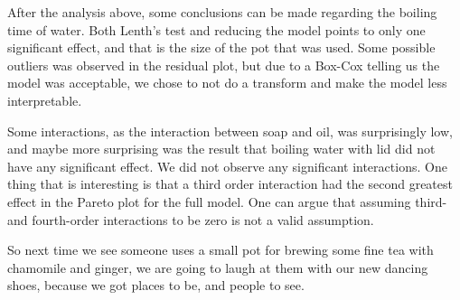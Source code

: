 After the analysis above, some conclusions can be made regarding the boiling time of water. Both Lenth's test and reducing the model points to only one significant effect, and that is the size of the pot that was used. Some possible outliers was observed in the residual plot, but due to a Box-Cox telling us the model was acceptable, we chose to not do a transform and make the model less interpretable.

Some interactions, as the interaction between soap and oil, was surprisingly low, and maybe more surprising was the result that boiling water with lid did not have any significant effect. We did not observe any significant interactions. One thing that is interesting is that a third order interaction had the second greatest effect in the Pareto plot for the full model. One can argue that assuming third- and fourth-order interactions to be zero is not a valid assumption.

So next time we see someone uses a small pot for brewing some fine tea with chamomile and ginger, we are going to laugh at them with our new dancing shoes, because we got places to be, and people to see. 